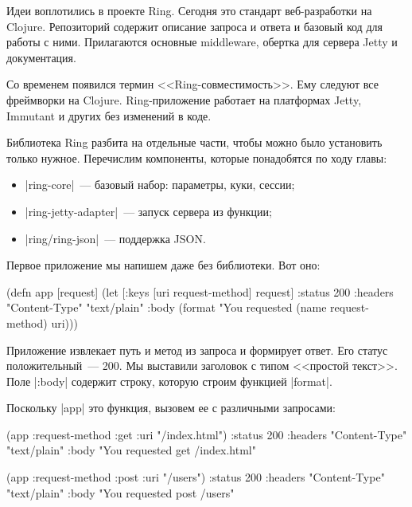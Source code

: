 \label{ring-jetty}

Идеи воплотились в проекте Ring.
Сегодня это стандарт веб-разработки на Clojure. Репозиторий содержит описание
запроса и ответа и базовый код для работы с ними. Прилагаются основные middleware,
обертка для сервера Jetty и документация.

Со временем появился термин <<Ring-совместимость>>. Ему следуют все фреймворки
на Clojure. Ring-приложение работает на платформах Jetty, Immutant и других без
изменений в коде.

Библиотека Ring разбита на отдельные части, чтобы можно было установить только
нужное. Перечислим компоненты, которые понадобятся по ходу главы:

\begin{itemize}

\item
  \spverb|ring-core|~--- базовый набор: параметры, куки, сессии;

\item
  \spverb|ring-jetty-adapter|~--- запуск сервера из функции;

\item
  \spverb|ring/ring-json|~--- поддержка JSON.

\end{itemize}

Первое приложение мы напишем даже без библиотеки. Вот оно:


\label{first-handler}

\begin{english}
  \begin{clojure}
(defn app [request]
  (let [{:keys [uri request-method]} request]
    {:status 200
     :headers {"Content-Type" "text/plain"}
     :body (format "You requested %
                   (name request-method) uri)}))
  \end{clojure}
\end{english}

Приложение извлекает путь и метод из запроса и формирует ответ. Его статус
положительный~--- 200. Мы выставили заголовок с типом <<простой текст>>. Поле
\spverb|:body| содержит строку, которую строим функцией \spverb|format|.

Поскольку \spverb|app| это функция, вызовем ее с различными запросами:

\begin{english}
  \begin{clojure}
(app {:request-method :get :uri "/index.html"})
{:status 200
 :headers {"Content-Type" "text/plain"}
 :body "You requested get /index.html"}

(app {:request-method :post :uri "/users"})
{:status 200
 :headers {"Content-Type" "text/plain"}
 :body "You requested post /users"}
  \end{clojure}
\end{english}

